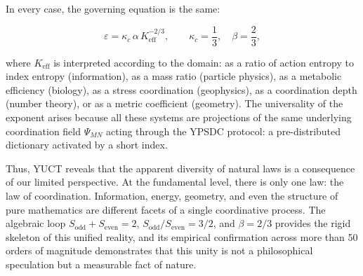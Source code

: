 \documentclass[12pt]{article}
\newcommand{\Sodd}{S_{\mathrm{odd}}}
\newcommand{\Seven}{S_{\mathrm{even}}}
\begin{document}
	In every case, the governing equation is the same:
	
	\begin{equation}
		\boxed{ \varepsilon = \kappa_c \, \alpha \, K_{\mathrm{eff}}^{-2/3} },
		\qquad \kappa_c = \frac{1}{3},\quad \beta = \frac{2}{3},
	\end{equation}
	
	where \(K_{\mathrm{eff}}\) is interpreted according to the domain: as a ratio of action entropy to index entropy (information), as a mass ratio (particle physics), as a metabolic efficiency (biology), as a stress coordination (geophysics), as a coordination depth (number theory), or as a metric coefficient (geometry). The universality of the exponent arises because all these systems are projections of the same underlying coordination field \(\Psi_{MN}\) acting through the YPSDC protocol: a pre-distributed dictionary activated by a short index.
	
	Thus, YUCT reveals that the apparent diversity of natural laws is a consequence of our limited perspective. At the fundamental level, there is only one law: the law of coordination. Information, energy, geometry, and even the structure of pure mathematics are different facets of a single coordinative process. The algebraic loop \(\Sodd + \Seven = 2\), \(\Sodd/\Seven = 3/2\), and \(\beta = 2/3\) provides the rigid skeleton of this unified reality, and its empirical confirmation across more than 50 orders of magnitude demonstrates that this unity is not a philosophical speculation but a measurable fact of nature.
	
\end{document}
